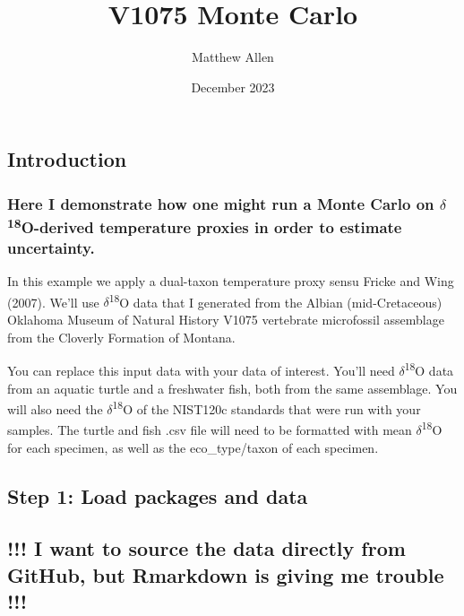 \documentclass[
]{article}
\title{V1075 Monte Carlo}
\author{Matthew Allen}
\date{December 2023}
\begin{document}
\maketitle

\hypertarget{introduction}{%
\subsection{Introduction}\label{introduction}}

\hypertarget{here-i-demonstrate-how-one-might-run-a-monte-carlo-on-delta18o-derived-temperature-proxies-in-order-to-estimate-uncertainty.}{%
\subsubsection{\texorpdfstring{Here I demonstrate how one might run a
Monte Carlo on \(\delta\)\textsuperscript{18}O-derived temperature
proxies in order to estimate
uncertainty.}{Here I demonstrate how one might run a Monte Carlo on \textbackslash delta18O-derived temperature proxies in order to estimate uncertainty.}}\label{here-i-demonstrate-how-one-might-run-a-monte-carlo-on-delta18o-derived-temperature-proxies-in-order-to-estimate-uncertainty.}}

In this example we apply a dual-taxon temperature proxy sensu Fricke and
Wing (2007). We'll use \(\delta\)\textsuperscript{18}O data that I
generated from the Albian (mid-Cretaceous) Oklahoma Museum of Natural
History V1075 vertebrate microfossil assemblage from the Cloverly
Formation of Montana.

You can replace this input data with your data of interest. You'll need
\(\delta\)\textsuperscript{18}O data from an aquatic turtle and a
freshwater fish, both from the same assemblage. You will also need the
\(\delta\)\textsuperscript{18}O of the NIST120c standards that were run
with your samples. The turtle and fish .csv file will need to be
formatted with mean \(\delta\)\textsuperscript{18}O for each specimen,
as well as the eco\_type/taxon of each specimen.

\hypertarget{step-1-load-packages-and-data}{%
\subsection{Step 1: Load packages and
data}\label{step-1-load-packages-and-data}}

\hypertarget{i-want-to-source-the-data-directly-from-github-but-rmarkdown-is-giving-me-trouble}{%
\subsection{!!! I want to source the data directly from GitHub, but
Rmarkdown is giving me trouble
!!!}\label{i-want-to-source-the-data-directly-from-github-but-rmarkdown-is-giving-me-trouble}}
\end{document}
